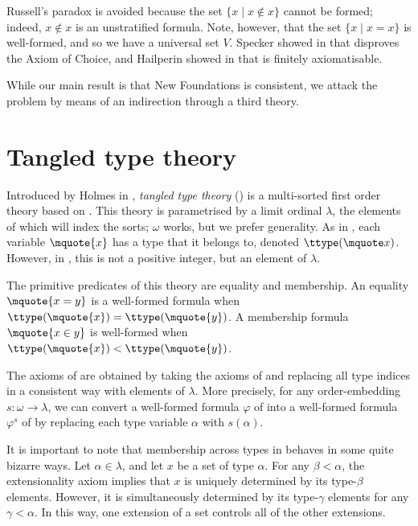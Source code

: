 Russell's paradox is avoided because the set \( \{ x \mid x \notin x \} \) cannot be formed; indeed, \( x \notin x \) is an unstratified formula.
Note, however, that the set \( \{ x \mid x = x \} \) is well-formed, and so we have a universal set \( V \).
Specker showed in \cite{specker-choice-nf} that {\NF} disproves the Axiom of Choice, and Hailperin showed in \cite{hailperin-finite-axiomatisation} that {\NF} is finitely axiomatisable.

While our main result is that New Foundations is consistent, we attack the problem by means of an indirection through a third theory.

\section{Tangled type theory}
\label{ss:theories:ttt}

Introduced by Holmes in \cite{holmes-ttt}, \emph{tangled type theory} ({\TTT}) is a multi-sorted first order theory based on {\TST}.
This theory is parametrised by a limit ordinal \( \lambda \), the elements of which will index the sorts; \( \omega \) works, but we prefer generality.
As in {\TST}, each variable \( \mquote{x} \) has a type that it belongs to, denoted \( \ttype(\mquote x) \).
However, in {\TTT}, this is not a positive integer, but an element of \( \lambda \).

The primitive predicates of this theory are equality and membership.
An equality \( \mquote{x = y} \) is a well-formed formula when \( \ttype(\mquote{x}) = \ttype(\mquote{y}) \).
A membership formula \( \mquote{x \in y} \) is well-formed when \( \ttype(\mquote{x}) < \ttype(\mquote{y}) \).

The axioms of {\TTT} are obtained by taking the axioms of {\TST} and replacing all type indices in a consistent way with elements of \( \lambda \).
More precisely, for any order-embedding \( s : \omega \to \lambda \), we can convert a well-formed formula \( \varphi \) of {\TST} into a well-formed formula \( \varphi^s \) of {\TTT} by replacing each type variable \( \alpha \) with \( s(\alpha) \).

It is important to note that membership across types in {\TTT} behaves in some quite bizarre ways.
Let \( \alpha \in \lambda \), and let \( x \) be a set of type \( \alpha \).
For any \( \beta < \alpha \), the extensionality axiom implies that \( x \) is uniquely determined by its type-\( \beta \) elements.
However, it is simultaneously determined by its type-\( \gamma \) elements for any \( \gamma < \alpha \).
In this way, one extension of a set controls all of the other extensions.

